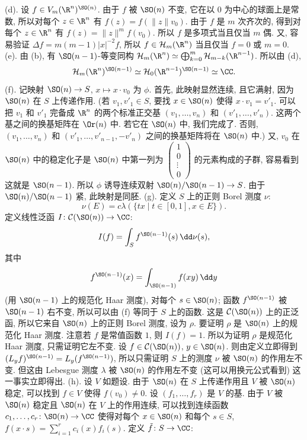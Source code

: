 \begin{solution}
(d). 设 $f \in V_m(\R^n)^{\SO(n)}$. 由于 $f$ 被 $\SO(n)$ 不变, 它在以 $0$ 为中心的球面上是常数, 所以对每个 $z \in \R^n$ 有 $f(z) = f(\|z\|v_0)$. 由于 $f$ 是 $m$ 次齐次的, 得到对每个 $z \in \R^n$ 有 $f(z) = \|z\|^mf(v_0)$. 所以 $f$ 是多项式当且仅当 $m$ 偶. 又, 容易验证 $\Delta f = m(m-1)|x|^{-2}f$, 所以 $f \in \mathcal{H}_m(\R^n)$ 当且仅当 $f = 0$ 或 $m = 0$.
(e). 由 (b), 有 $\SO(n-1)$-等变同构 $\mathcal{H}_m(\R^n) \simeq \bigoplus_{k=0}^m\mathcal{H}_{m-k}(\R^{n-1})$. 所以由 (d),
\[
\mathcal{H}_m(\R^n)^{\SO(n-1)} \simeq \mathcal{H}_0(\R^{n-1})^{\SO(n-1)} \simeq \CC.
\]
(f). 记映射 $\SO(n) \to S$, $x \longmapsto x \cdot v_0$ 为 $\phi$. 首先, 此映射显然连续, 且它满射, 因为 $\SO(n)$ 在 $S$ 上传递作用. (若 $v_1, v'_1 \in S$, 要找 $x \in \SO(n)$ 使得 $x \cdot v_1 = v'_1$. 可以把 $v_1$ 和 $v'_1$ 完备成 $\R^n$ 的两个标准正交基 $(v_1, \ldots, v_n)$ 和 $(v'_1, \ldots, v'_n)$. 这两个基之间的换基矩阵在 $\Or(n)$ 中. 若它在 $\SO(n)$ 中, 我们完成了. 否则, $(v_1, \ldots, v_n)$ 和 $(v'_1, \ldots, v'_{n-1}, -v'_n)$ 之间的换基矩阵将在 $\SO(n)$ 中.)
又, $v_0$ 在 $\SO(n)$ 中的稳定化子是 $\SO(n)$ 中第一列为 $\begin{pmatrix} 1 \\ 0 \\ \vdots \\ 0 \end{pmatrix}$ 的元素构成的子群, 容易看到这就是 $\SO(n-1)$. 所以 $\phi$ 诱导连续双射 $\SO(n)/\SO(n-1) \to S$. 由于 $\SO(n)/\SO(n-1)$ 紧, 此映射是同胚.
(g). 定义 $S$ 上的正则 Borel 测度 $\nu$:
\[
\nu(E) = c\lambda(\{tx \mid t \in [0,1], x \in E\}).
\]
定义线性泛函 $I \colon \mathcal{C}(\SO(n)) \to \CC$:
\[
I(f) = \int_S f^{\SO(n-1)}(s)\,\dd\nu(s),
\]
其中
\[
f^{\SO(n-1)}(x) = \int_{\SO(n-1)}f(xy)\,\dd y
\]
(用 $\SO(n-1)$ 上的规范化 Haar 测度), 对每个 $s \in \SO(n)$; 函数 $f^{\SO(n-1)}$ 被 $\SO(n-1)$ 右不变, 所以可以由 (f) 等同于 $S$ 上的函数.
这是 $\mathcal{C}(\SO(n))$ 上的正泛函, 所以它来自 $\SO(n)$ 上的正则 Borel 测度, 设为 $\rho$. 要证明 $\rho$ 是 $\SO(n)$ 上的规范化 Haar 测度.
注意若 $f$ 是常值函数 $1$, 则 $I(f) = 1$. 所以为证明 $\rho$ 是规范化 Haar 测度, 只需证明它左不变. 设 $f \in \mathcal{C}(\SO(n))$, $y \in \SO(n)$. 则由定义立即得到 $(L_yf)^{\SO(n-1)} = L_y(f^{\SO(n-1)})$, 所以只需证明 $S$ 上的测度 $\nu$ 被 $\SO(n)$ 的作用左不变. 但这由 Lebesgue 测度 $\lambda$ 被 $\SO(n)$ 的作用左不变 (这可以用换元公式看到) 这一事实立即得出.
(h). 设 $V$ 如题设. 由于 $\SO(n)$ 在 $S$ 上传递作用且 $V$ 被 $\SO(n)$ 稳定, 可以找到 $f \in V$ 使得 $f(v_0) \neq 0$. 设 $(f_1, \ldots, f_r)$ 是 $V$ 的基. 由于 $V$ 被 $\SO(n)$ 稳定且 $\SO(n)$ 在 $V$ 上的作用连续, 可以找到连续函数 $c_1, \ldots, c_r \colon \SO(n) \to \CC$ 使得对每个 $x \in \SO(n)$ 和每个 $s \in S$, $f(x \cdot s) = \sum_{i=1}^r c_i(x)f_i(s)$. 定义 $\tilde{f} \colon S \to \CC$:

\end{solution}
